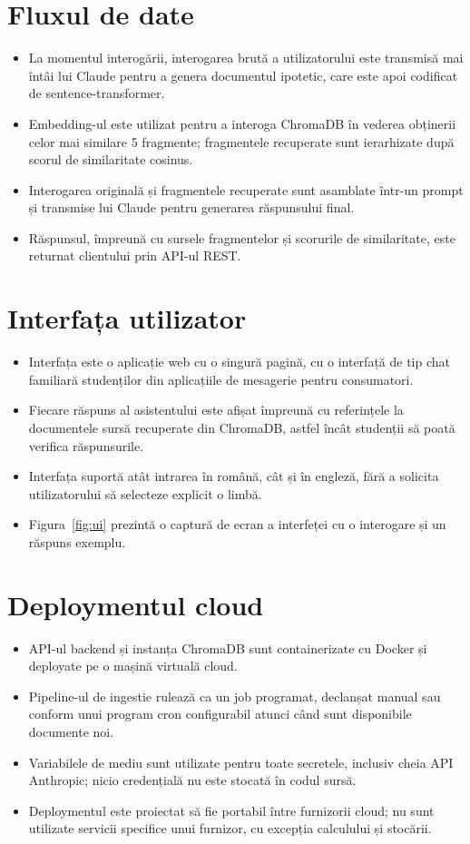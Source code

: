 \documentclass[12pt,a4paper]{report}
\begin{document}
\section{Fluxul de date}
\begin{itemize}
    \item La momentul interogării, interogarea brută a utilizatorului este transmisă mai întâi lui Claude pentru a genera documentul ipotetic, care este apoi codificat de sentence-transformer.
    \item Embedding-ul este utilizat pentru a interoga ChromaDB în vederea obținerii celor mai similare 5 fragmente; fragmentele recuperate sunt ierarhizate după scorul de similaritate cosinus.
    \item Interogarea originală și fragmentele recuperate sunt asamblate într-un prompt și transmise lui Claude pentru generarea răspunsului final.
    \item Răspunsul, împreună cu sursele fragmentelor și scorurile de similaritate, este returnat clientului prin API-ul REST.
\end{itemize}

\section{Interfața utilizator}
\begin{itemize}
    \item Interfața este o aplicație web cu o singură pagină, cu o interfață de tip chat familiară studenților din aplicațiile de mesagerie pentru consumatori.
    \item Fiecare răspuns al asistentului este afișat împreună cu referințele la documentele sursă recuperate din ChromaDB, astfel încât studenții să poată verifica răspunsurile.
    \item Interfața suportă atât intrarea în română, cât și în engleză, fără a solicita utilizatorului să selecteze explicit o limbă.
    \item Figura~\ref{fig:ui} prezintă o captură de ecran a interfeței cu o interogare și un răspuns exemplu.
\end{itemize}

\section{Deploymentul cloud}
\begin{itemize}
    \item API-ul backend și instanța ChromaDB sunt containerizate cu Docker și deployate pe o mașină virtuală cloud.
    \item Pipeline-ul de ingestie rulează ca un job programat, declanșat manual sau conform unui program cron configurabil atunci când sunt disponibile documente noi.
    \item Variabilele de mediu sunt utilizate pentru toate secretele, inclusiv cheia API Anthropic; nicio credențială nu este stocată în codul sursă.
    \item Deploymentul este proiectat să fie portabil între furnizorii cloud; nu sunt utilizate servicii specifice unui furnizor, cu excepția calculului și stocării.
\end{itemize}
\end{document}
